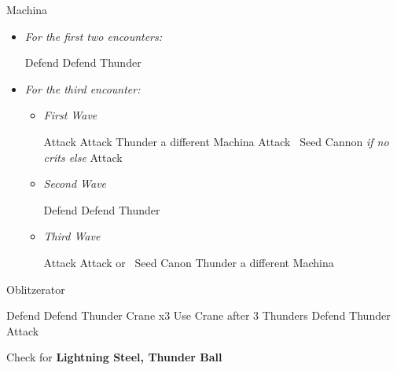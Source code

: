 \begin{battle}{Machina}
	\begin{itemize}
		\item \textit{For the first two encounters:}
		      \begin{itemize}
			      \tidusf Defend
			      \kimahrif Defend
			      \luluf Thunder
		      \end{itemize}
		\item \textit{For the third encounter:}
		      \begin{itemize}
			      \item \textit{First Wave}
			            \begin{itemize}
				            \tidusf Attack
				            \kimahrif Attack
				            \luluf Thunder a different Machina
				            \tidusf Attack
				            \kimahrif \od\ Seed Cannon \textit{if no crits else} Attack
			            \end{itemize}
			      \item \textit{Second Wave}
			            \begin{itemize}
				            \tidusf Defend
				            \kimahrif Defend
				            \luluf Thunder
			            \end{itemize}
			      \item \textit{Third Wave}
			            \begin{itemize}
				            \tidusf Attack
				            \kimahrif Attack or \od\ Seed Canon
				            \luluf Thunder a different Machina
			            \end{itemize}
		      \end{itemize}
	\end{itemize}
\end{battle}
\begin{battle}[3000]{Oblitzerator}
	\begin{itemize}
		\kimahrif Defend
		\tidusf Defend
		\luluf Thunder Crane x3
		\tidusf Use Crane after 3 Thunders
		\kimahrif Defend
		\luluf Thunder
		\tidusf Attack
	\end{itemize}
	Check for \textbf{Lightning Steel, Thunder Ball}
\end{battle}
